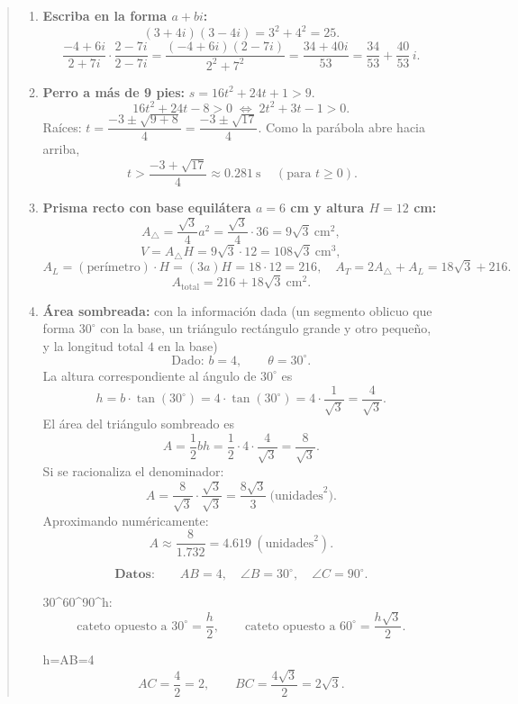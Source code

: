 \documentclass[]{article}
\begin{document}
\begin{abstract}
\begin{enumerate}
	\item \textbf{Escriba en la forma $a+bi$:}
	\[
	(3+4i)(3-4i)=3^2+4^2=\boxed{25}.
	\]
	\[
	\frac{-4+6i}{2+7i}\cdot\frac{2-7i}{2-7i}
	=\frac{(-4+6i)(2-7i)}{2^2+7^2}
	=\frac{34+40i}{53}
	=\boxed{\frac{34}{53}+\frac{40}{53}\,i}.
	\]
	
	\item \textbf{Perro a más de 9 pies:} $s=16t^2+24t+1>9$.
	\[
	16t^2+24t-8>0 \;\Longleftrightarrow\; 2t^2+3t-1>0.
	\]
	Raíces: $t=\dfrac{-3\pm\sqrt{9+8}}{4}=\dfrac{-3\pm\sqrt{17}}{4}$.
	Como la parábola abre hacia arriba, 
	\[
	\boxed{\,t>\dfrac{-3+\sqrt{17}}{4}\approx 0.281\ \text{s}\,}
	\quad (\text{para } t\ge 0).
	\]
	
	\item \textbf{Prisma recto con base equilátera $a=6$ cm y altura $H=12$ cm:}
	\[
	A_{\triangle}=\frac{\sqrt{3}}{4}a^2=\frac{\sqrt{3}}{4}\cdot 36=9\sqrt{3}\ \text{cm}^2,
	\]
	\[
	V=A_{\triangle}H=9\sqrt{3}\cdot 12=\boxed{108\sqrt{3}\ \text{cm}^3},
	\]
	\[
	A_L=(\text{perímetro})\cdot H=(3a)H=18\cdot 12=216,
	\quad A_T=2A_{\triangle}+A_L=18\sqrt{3}+216.
	\]
	\[
	\boxed{A_{\text{total}}=216+18\sqrt{3}\ \text{cm}^2}.
	\]
	
		\item \textbf{Área sombreada:} con la información dada (un segmento oblicuo que forma $30^\circ$ con la base,
	un triángulo rectángulo grande y otro pequeño, y la longitud total $4$ en la base)
\[
\text{Dado: } b=4,\qquad \theta=30^\circ.
\]
La altura correspondiente al ángulo de \(30^\circ\) es
\[
h=b\cdot \tan(30^\circ)=4\cdot \tan(30^\circ)=4\cdot\frac{1}{\sqrt{3}}=\frac{4}{\sqrt{3}}.
\]
El área del triángulo sombreado es
\[
A=\frac{1}{2}bh=\frac{1}{2}\cdot 4\cdot \frac{4}{\sqrt{3}}
=\frac{8}{\sqrt{3}}.
\]
Si se racionaliza el denominador:
\[
A=\frac{8}{\sqrt{3}}\cdot\frac{\sqrt{3}}{\sqrt{3}}
=\frac{8\sqrt{3}}{3}\ \text{(unidades}^2\text{)}.
\]
Aproximando numéricamente:
\[
A\approx \frac{8}{1.732}=4.619\ (\text{unidades}^2).
\]



\[
\textbf{Datos:}\qquad AB=4,\quad \angle B=30^\circ,\quad \angle C=90^\circ.
\]

30^\circ\text{-}60^\circ\text{-}90^\circ{}h:
\]
\[
\text{cateto opuesto a }30^\circ=\frac{h}{2},\qquad
\text{cateto opuesto a }60^\circ=\frac{h\sqrt{3}}{2}.
\]

h=AB=4 \Rightarrow
\]
\[
AC=\frac{4}{2}=2,\qquad BC=\frac{4\sqrt{3}}{2}=2\sqrt{3}.
\]


\end{enumerate}
\end{abstract}
\end{document}
